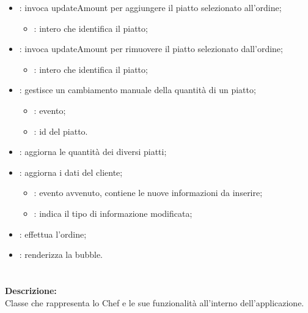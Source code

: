 \begin{itemize}
	\item {}: invoca updateAmount per aggiungere il piatto selezionato all'ordine;
		\begin{itemize}
			\item {}: intero che identifica il piatto;
		\end{itemize}
	\item {}: invoca updateAmount per rimuovere il piatto selezionato dall'ordine;
		\begin{itemize}
			\item {}: intero che identifica il piatto;
		\end{itemize}
	\item {}: gestisce un cambiamento manuale della quantità di un piatto;
		\begin{itemize}
			\item {}: evento;
			\item {}: id del piatto.
		\end{itemize}
	\item {}: aggiorna le quantità dei diversi piatti;
	\item {}: aggiorna i dati del cliente;
		\begin{itemize}
			\item {}: evento avvenuto, contiene le nuove informazioni da inserire;
			\item {}: indica il tipo di informazione modificata;
		\end{itemize}
	\item {}: effettua l'ordine;
	\item {}: renderizza la bubble.
\end{itemize}

\paragraph[::ChefBubble]{\class}\mbox{}\\ \label{\class}
\textbf{Descrizione:}\\
Classe che rappresenta lo Chef e le sue funzionalità all'interno dell'applicazione.


